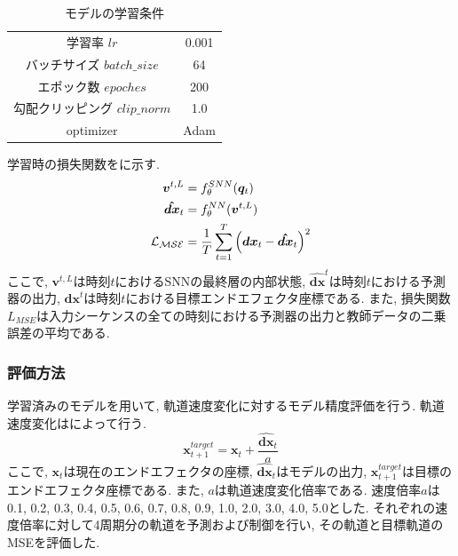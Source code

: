 \begin{table}[htb]
    \centering
    \caption{モデルの学習条件}
    \label{tab:exp3:train:parameter}
    \begin{tabular}{cc}
        \hline
        学習率 $lr$ & 0.001\\
        バッチサイズ $batch\_size$ & 64\\
        エポック数 $epoches$ & 200\\
        勾配クリッピング $clip\_norm$ & 1.0\\
        optimizer & Adam\\
        \hline
    \end{tabular}
\end{table}

学習時の損失関数をに示す.
\begin{align}
    \bm{v}^{t,L} &= f_{\theta}^{SNN}(\bm{q}_{t}) \notag \\
    \bm{\hat{dx}}_{t} &= f_{\theta}^{NN}(\bm{v}^{t,L}) \notag \\
    \mathcal{L_{MSE}} &= \frac{1}{T} \sum_{t=1}^{T} \left( \bm{dx}_{t} - \bm{\hat{dx}}_{t} \right)^2 \label{eq:exp3:loss}
\end{align}
ここで, $\bm{v}^{t,L}$は時刻$t$におけるSNNの最終層の内部状態, $\bm{\hat{dx}}^{t}$は時刻$t$における予測器の出力, $\bm{dx}^{t}$は時刻$t$における目標エンドエフェクタ座標である.
また, 損失関数$L_{MSE}$は入力シーケンスの全ての時刻における予測器の出力と教師データの二乗誤差の平均である.


\subsubsection{評価方法}
学習済みのモデルを用いて, 軌道速度変化に対するモデル精度評価を行う.
軌道速度変化はによって行う.
\begin{equation}
    \bm{x}_{t+1}^{target} = \bm{x}_{t} + \frac{\bm{\hat{dx}}_{t}} {a} \label{eq:exp3:target_trajectoryx}
\end{equation}
ここで, $\bm{x}_{t}$は現在のエンドエフェクタの座標, $\bm{\hat{dx}}_{t}$はモデルの出力, $\bm{x}_{t+1}^{target}$は目標のエンドエフェクタ座標である.
また, $a$は軌道速度変化倍率である.
速度倍率$a$は0.1, 0.2, 0.3, 0.4, 0.5, 0.6, 0.7, 0.8, 0.9, 1.0, 2.0, 3.0, 4.0, 5.0とした.
それぞれの速度倍率に対して4周期分の軌道を予測および制御を行い, その軌道と目標軌道のMSEを評価した.


